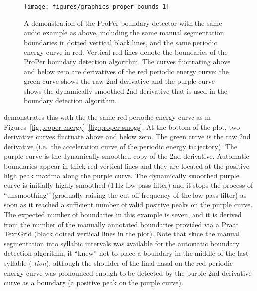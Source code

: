 \begin{figure}
\texttt{[image: figures/graphics-proper-bounds-1]}
\caption{A demonstration of the ProPer boundary detector with the same audio example as above, including the same manual segmentation boundaries in dotted vertical black lines, and the same periodic energy curve in red. Vertical red lines denote the boundaries of the ProPer boundary detection algorithm. The curves fluctuating above and below zero are derivatives of the red periodic energy curve: the green curve shows the raw 2nd derivative and the purple curve shows the dynamically smoothed 2nd derivative that is used in the boundary detection algorithm.}\label{fig:proper-bounds}
\end{figure}

 demonstrates this with the the same red periodic energy curve as in Figures~\ref{fig:proper-energy}--\ref{fig:proper-smogs}. At the bottom of the plot, two derivative curves fluctuate above and below zero. The green curve is the raw 2nd derivative (i.e.~the acceleration curve of the periodic energy trajectory). The purple curve is the dynamically smoothed copy of the 2nd derivative. 
Automatic boundaries appear in thick red vertical lines and they are located at the positive high peak maxima along the purple curve. The dynamically smoothed purple curve 
is initially highly smoothed (1\,Hz low-pass filter) and it stops the process of \enquote{unsmoothing} 
(gradually raising the cut-off frequency of the low-pass filter)
as soon as it reached a sufficient number of valid positive peaks on the purple curve. The expected number of boundaries in this example is seven, and it is derived from the number of the manually annotated boundaries provided via a Praat TextGrid (black dotted vertical lines in the plot). Note that since the manual segmentation into syllabic intervals was available for the automatic boundary detection algorithm, it \enquote{knew} not to place a boundary in the middle of the last syllable (\emph{-tion}), although the shoulder of the final nasal on the red periodic energy curve was pronounced enough to be detected by the purple 2nd derivative curve as a boundary (a positive peak on the purple curve).

